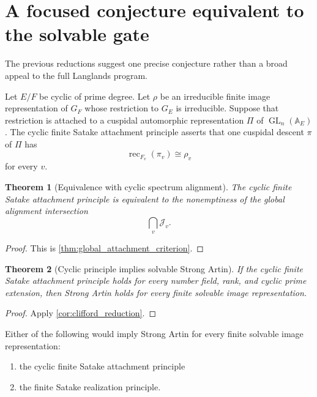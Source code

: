 \documentclass{aomart}
\newtheorem{theorem}{Theorem}[section]
\theoremstyle{definition}
\theoremstyle{remark}
\newcommand{\Adele}{\mathbb A}
\newcommand{\GL}{\operatorname{GL}}
\newcommand{\rec}{\operatorname{rec}}
\newcommand{\calJ}{\mathcal J}
\begin{document}
\section{A focused conjecture equivalent to the solvable gate}\label{sec:focused_conjecture}

The previous reductions suggest one precise conjecture rather than a broad appeal to the full Langlands program.

\begin{definition}\label{def:CFSA}
Let \(E/F\) be cyclic of prime degree. Let \(\rho\) be an irreducible finite image representation of \(G_F\) whose restriction to \(G_E\) is irreducible. Suppose that restriction is attached to a cuspidal automorphic representation \(\Pi\) of \(\GL_n(\Adele_E)\). The cyclic finite Satake attachment principle asserts that one cuspidal descent \(\pi\) of \(\Pi\) has
\[
 \rec_{F_v}(\pi_v)
 \cong
 \rho_v
\]
for every \(v\).
\end{definition}

\begin{theorem}[Equivalence with cyclic spectrum alignment]\label{thm:CFSA_alignment}
The cyclic finite Satake attachment principle is equivalent to the nonemptiness of the global alignment intersection
\[
 \boxed{
 \bigcap_v\calJ_v.
 }
\]
\end{theorem}

\begin{proof}
This is \cref{thm:global_attachment_criterion}.
\end{proof}

\begin{theorem}[Cyclic principle implies solvable Strong Artin]\label{thm:CFSA_solvable}
If the cyclic finite Satake attachment principle holds for every number field, rank, and cyclic prime extension, then Strong Artin holds for every finite solvable image representation.
\end{theorem}

\begin{proof}
Apply \cref{cor:clifford_reduction}.
\end{proof}

\begin{corollary}\label{cor:two_sufficient_targets}
Either of the following would imply Strong Artin for every finite solvable image representation:

\begin{enumerate}
\item the cyclic finite Satake attachment principle
\item the finite Satake realization principle.
\end{enumerate}
\end{corollary}
\end{document}
